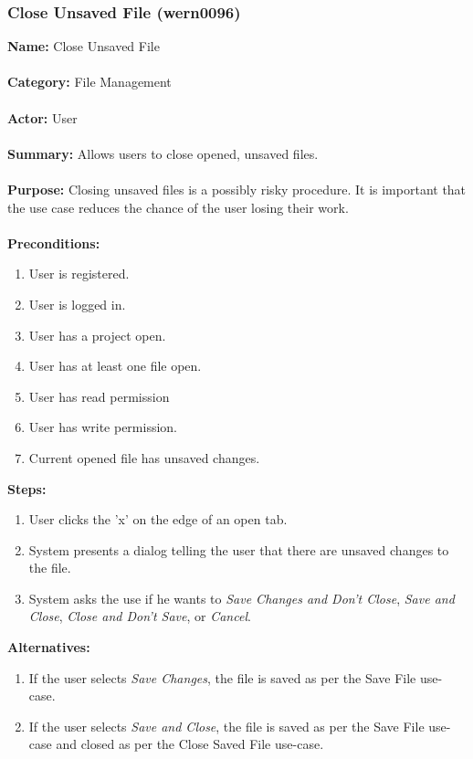 \documentclass[11pt]{report}
\begin{document}
\subsubsection{Close Unsaved File (wern0096)}
\begin{framed}
	\noindent\textbf{Name:} Close Unsaved File \\ \\
	\textbf{Category:} File Management \\ \\
	\textbf{Actor:} User \\ \\
	\textbf{Summary:} Allows users to close opened, unsaved files. \\ \\
	\textbf{Purpose:} Closing unsaved files is a possibly risky procedure. It is important that the use case reduces the chance of the user losing their work. \\ \\
	\textbf{Preconditions:} 
	\begin{enumerate}
		\item User is registered.
		\item User is logged in.
		\item User has a project open.
		\item User has at least one file open.
		\item User has read permission
		\item User has write permission.
		\item Current opened file has unsaved changes.
	\end{enumerate}		
	\textbf{Steps:}
	\begin{enumerate}
		\item User clicks the 'x' on the edge of an open tab.
		\item System presents a dialog telling the user that there are unsaved changes to the file.
		\item System asks the use if he wants to \textit{Save Changes and Don't Close}, \textit{Save and Close}, \textit{Close and Don't Save}, or \textit{Cancel}.
	\end{enumerate}	
	\textbf{Alternatives:}
	\begin{enumerate}
		\item If the user selects \textit{Save Changes}, the file is saved as per the Save File use-case.
		\item If the user selects \textit{Save and Close}, the file is saved as per the Save File use-case and closed as per the Close Saved File use-case.

\end{enumerate}
\end{framed}
\end{document}

